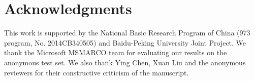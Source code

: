 \documentclass[11pt,a4paper]{article}
\begin{document}












\section*{Acknowledgments}
This work is supported by the National Basic Research Program of China (973 program, No. 2014CB340505) and Baidu-Peking University Joint Project.
We thank the Microsoft MSMARCO team for evaluating our results on the anonymous test set. We also thank Ying Chen, Xuan Liu and the anonymous reviewers for their constructive criticism of the manuscript.


%
%


\end{document}
